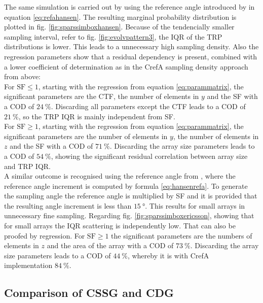 The same simulation is carried out by using the reference angle introduced by \cite{hansen} in equation \ref{eq:refahansen}. The resulting marginal probability distribution is plotted in fig. \ref{fig:sparssimboxhansen}. Because of the tendencially smaller sampling interval, refer to fig. \ref{fig:evolvpattern3}, the \ac{IQR} of the \ac{TRP} distributions is lower. This leads to a unnecessary high sampling density. Also the regression parameters show that a residual dependency is present, combined with a lower coefficient of determination as in the \ac{CrefA} sampling density approach from above:\\
For $\text{SF}\le 1$, starting with the regression from equation \ref{eq:parammatrix}, the significant parameters are the \ac{CTF}, the number of elements in $y$ and the \ac{SF} with a \ac{COD} of $\SI{24}{\percent}$. Discarding all parameters except the \ac{CTF} leads to a \ac{COD} of $\SI{21}{\percent}$, so the \ac{TRP} \ac{IQR} is mainly independent from \ac{SF}.\\
For $\text{SF}\ge 1$, starting with the regression from equation \ref{eq:parammatrix}, the significant parameters are the number of elements in $y$, the number of elements in $z$ and the \ac{SF} with a \ac{COD} of $\SI{71}{\percent}$. Discarding the array size parameters leads to a \ac{COD} of $\SI{54}{\percent}$, showing the significant residual correlation between array size and \ac{TRP} \ac{IQR}.\\
A similar outcome is recognised using the reference angle from \cite{2018arXiv180310993F}, where the reference angle increment is computed by formula \ref{eq:hansenrefa}.
To generate the sampling angle the reference angle is multiplied by \ac{SF} and it is provided that the resulting angle increment is less than $\SI{15}{\degree}$.
This results for small arrays in unnecessary fine sampling.
Regarding fig. \ref{fig:sparssimboxericsson}, showing that for small arrays the \ac{IQR} scattering is independently low. That can also be proofed by regression. For $\text{SF}\ge 1$ the significant parameters are the numbers of elements in $z$ and the area of the array with a \ac{COD} of $\SI{73}{\percent}$. Discarding the array size parameters leads to a \ac{COD} of $\SI{44}{\percent}$, whereby it is with \ac{CrefA} implementation $\SI{84}{\percent}$.

\subsection{Comparison of CSSG and CDG}

